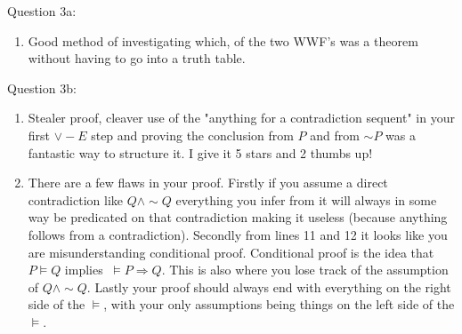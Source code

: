 \documentclass[11pt] {article}
\begin{document}
Question 3a:
\begin{enumerate}
\item Good method of investigating which, of the two WWF's was a theorem without having to go into a truth table. 
\end{enumerate}
Question 3b:
\begin{enumerate}
\item Stealer proof, cleaver use of the "anything for a contradiction sequent" in your first $\lor -E$ step and proving the conclusion from $P$ and from $\sim P$ was a fantastic way to structure it. I give it 5 stars and 2 thumbs up! 
\item There are a few flaws in your proof. Firstly if you assume a direct contradiction like $Q\land \sim Q$ everything you infer from it will always in some way be predicated on that contradiction making it useless (because anything follows from a contradiction). Secondly from lines 11 and 12 it looks like you are misunderstanding conditional proof. Conditional proof is the idea that $P \vDash Q$ implies $\ \vDash P \Rightarrow Q$. This is also where you lose track of the assumption of $Q\land \sim Q$. Lastly your proof should always end with everything on the right side of the $\vDash$, with your only assumptions being things on the left side of the $\vDash$.
\end{enumerate}
\end{document}
